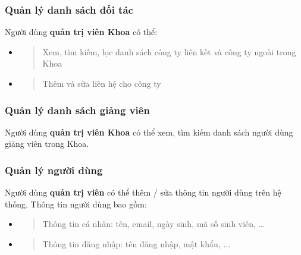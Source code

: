 \documentclass[./../main.tex]{subfiles}
\begin{document}
\hypertarget{quux1ea3n-luxfd-danh-suxe1ch-ux111ux1ed1i-tuxe1c}{%
	\subsubsection{Quản lý danh sách đối
		tác}\label{quux1ea3n-luxfd-danh-suxe1ch-ux111ux1ed1i-tuxe1c}}
  
Người dùng \textbf{quản trị viên Khoa} có thể:
  
\begin{itemize}
	\item
	      \begin{quote}
	      	Xem, tìm kiếm, lọc danh sách công ty liên kết và công ty ngoài trong
	      	Khoa
	      \end{quote}
	\item
	      \begin{quote}
	      	Thêm và sửa liên hệ cho công ty
	      \end{quote}
\end{itemize}
  
\hypertarget{quux1ea3n-luxfd-danh-suxe1ch-giux1ea3ng-viuxean}{%
	\subsubsection{Quản lý danh sách giảng
		viên}\label{quux1ea3n-luxfd-danh-suxe1ch-giux1ea3ng-viuxean}}
  
Người dùng \textbf{quản trị viên Khoa} có thể xem, tìm kiếm danh sách
người dùng giảng viên trong Khoa.
  
\hypertarget{quux1ea3n-luxfd-ngux1b0ux1eddi-duxf9ng}{%
	\subsubsection{Quản lý người
		dùng}\label{quux1ea3n-luxfd-ngux1b0ux1eddi-duxf9ng}}
  
Người dùng \textbf{quản trị viên} có thể thêm / sửa thông tin người dùng
trên hệ thống. Thông tin người dùng bao gồm:
  
\begin{itemize}
	\item
	      \begin{quote}
	      	Thông tin cá nhân: tên, email, ngày sinh, mã số sinh viên, \ldots{}
	      \end{quote}
	\item
	      \begin{quote}
	      	Thông tin đăng nhập: tên đăng nhập, mật khẩu, ...
	      \end{quote}
\end{itemize}
  
\end{document}
